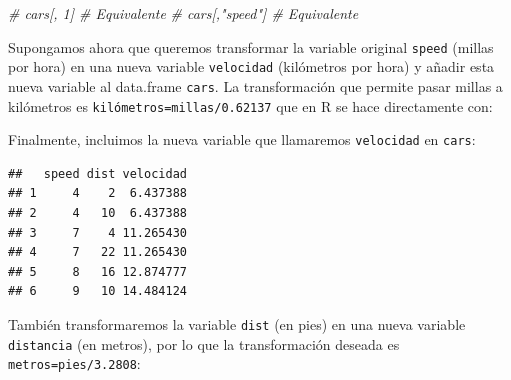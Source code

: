 \documentclass[
]{book}
\newenvironment{Shaded}{\begin{snugshade}}{\end{snugshade}}
\newcommand{\CommentTok}[1]{\textcolor[rgb]{0.56,0.35,0.01}{\textit{#1}}}
\newcommand{\DecValTok}[1]{\textcolor[rgb]{0.00,0.00,0.81}{#1}}
\newcommand{\FloatTok}[1]{\textcolor[rgb]{0.00,0.00,0.81}{#1}}
\newcommand{\FunctionTok}[1]{\textcolor[rgb]{0.13,0.29,0.53}{\textbf{#1}}}
\newcommand{\NormalTok}[1]{#1}
\newcommand{\OtherTok}[1]{\textcolor[rgb]{0.56,0.35,0.01}{#1}}
\newcommand{\SpecialCharTok}[1]{\textcolor[rgb]{0.81,0.36,0.00}{\textbf{#1}}}
\begin{document}
\begin{Shaded}
\begin{Highlighting}[]
\CommentTok{\# cars[, 1]       \# Equivalente}
\CommentTok{\# cars[,"speed"]  \# Equivalente}
\end{Highlighting}
\end{Shaded}

Supongamos ahora que queremos transformar la variable original \texttt{speed}
(millas por hora) en una nueva variable \texttt{velocidad} (kilómetros por
hora) y añadir esta nueva variable al data.frame \texttt{cars}.
La transformación que permite pasar millas a kilómetros es
\texttt{kilómetros=millas/0.62137} que en R se hace directamente con:

\begin{Shaded}
\end{Shaded}

Finalmente, incluimos la nueva variable que llamaremos
\texttt{velocidad} en \texttt{cars}:

\begin{Shaded}
\end{Shaded}

\begin{verbatim}
##   speed dist velocidad
## 1     4    2  6.437388
## 2     4   10  6.437388
## 3     7    4 11.265430
## 4     7   22 11.265430
## 5     8   16 12.874777
## 6     9   10 14.484124
\end{verbatim}

También transformaremos la variable \texttt{dist} (en pies) en una nueva
variable \texttt{distancia} (en metros), por lo que la transformación deseada es
\texttt{metros=pies/3.2808}:

\begin{Shaded}
\end{Shaded}
\end{document}

